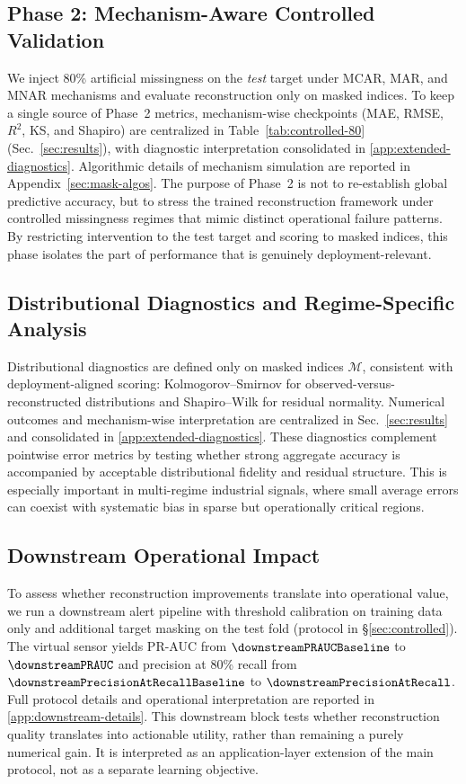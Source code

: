 \subsection{Phase 2: Mechanism-Aware Controlled Validation}\label{sec:phase2}

We inject 80\% artificial missingness on the \emph{test} target under MCAR, MAR, and MNAR mechanisms and evaluate reconstruction only on masked indices. To keep a single source of Phase~2 metrics, mechanism-wise checkpoints (MAE, RMSE, $R^2$, KS, and Shapiro) are centralized in Table~\ref{tab:controlled-80} (Sec.~\ref{sec:results}), with diagnostic interpretation consolidated in \ref{app:extended-diagnostics}. Algorithmic details of mechanism simulation are reported in Appendix~\ref{sec:mask-algos}.
The purpose of Phase~2 is not to re-establish global predictive accuracy, but to stress the trained reconstruction framework under controlled missingness regimes that mimic distinct operational failure patterns. By restricting intervention to the test target and scoring to masked indices, this phase isolates the part of performance that is genuinely deployment-relevant.

\subsection{Distributional Diagnostics and Regime-Specific Analysis}\label{sec:diagnostics}

Distributional diagnostics are defined only on masked indices $\mathcal{M}$, consistent with deployment-aligned scoring: Kolmogorov--Smirnov for observed-versus-reconstructed distributions and Shapiro--Wilk for residual normality. Numerical outcomes and mechanism-wise interpretation are centralized in Sec.~\ref{sec:results} and consolidated in \ref{app:extended-diagnostics}.
These diagnostics complement pointwise error metrics by testing whether strong aggregate accuracy is accompanied by acceptable distributional fidelity and residual structure. This is especially important in multi-regime industrial signals, where small average errors can coexist with systematic bias in sparse but operationally critical regions.

\subsection{Downstream Operational Impact}\label{sec:downstream}

To assess whether reconstruction improvements translate into operational value, we run a downstream alert pipeline with threshold calibration on training data only and additional target masking on the test fold (protocol in \S\ref{sec:controlled}). The virtual sensor yields PR-AUC from $\downstreamPRAUCBaseline$ to $\downstreamPRAUC$ and precision at 80\% recall from $\downstreamPrecisionAtRecallBaseline$ to $\downstreamPrecisionAtRecall$. Full protocol details and operational interpretation are reported in \ref{app:downstream-details}.
This downstream block tests whether reconstruction quality translates into actionable utility, rather than remaining a purely numerical gain. It is interpreted as an application-layer extension of the main protocol, not as a separate learning objective.


